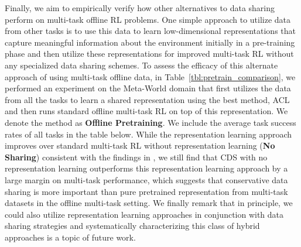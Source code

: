 {Finally, we aim to empirically verify how other alternatives to data sharing perform on multi-task offline RL problems. One simple approach to utilize data from other tasks is to use this data to learn low-dimensional representations that capture meaningful information about the environment initially in a pre-training phase and then utilize these representations for improved multi-task RL without any specialized data sharing schemes. To assess the efficacy of this alternate approach of using multi-task offline data, in Table~\ref{tbl:pretrain_comparison}, we performed an experiment on the Meta-World domain that first utilizes the data from all the tasks to learn a shared representation using the best method, ACL~\citep{yang2021representation} and then runs standard offline multi-task RL on top of this representation. We denote the method as \textbf{Offline Pretraining}. We include the average task success rates of all tasks in the table below. While the representation learning approach improves over standard multi-task RL without representation learning (\textbf{No Sharing}) consistent with the findings in \citep{yang2021representation}, we still find that CDS with no representation learning outperforms this representation learning approach by a large margin on multi-task performance, which suggests that conservative data sharing is more important than pure pretrained representation from multi-task datasets in the offline multi-task setting. We finally remark that in principle, we could also utilize representation learning approaches in conjunction with data sharing strategies and systematically characterizing this class of hybrid approaches is a topic of future work.}

